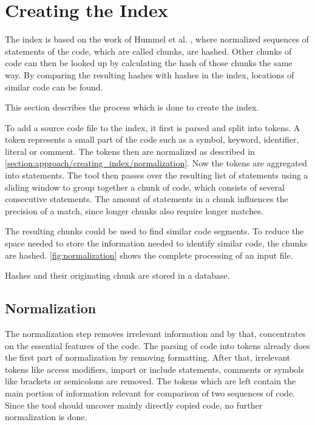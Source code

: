 \section{Creating the Index}\label{section:approach/creating_index}
The index is based on the work of Hummel et al. \cite{hummel2010index}, where normalized sequences of statements of the code, which are called chunks, are hashed.
Other chunks of code can then be looked up by calculating the hash of those chunks the same way.
By comparing the resulting hashes with hashes in the index, locations of similar code can be found.

This section describes the process which is done to create the index.

To add a source code file to the index, it first is parsed and split into tokens.
A token represents a small part of the code such as a symbol, keyword, identifier, literal or comment.
The tokens then are normalized as described in \autoref{section:approach/creating_index/normalization}.
Now the tokens are aggregated into statements.
The tool then passes over the resulting list of statements using a sliding window to group together a chunk of code, which consists of several consecutive statements.
The amount of statements in a chunk influences the precision of a match, since longer chunks also require longer matches.

The resulting chunks could be used to find similar code segments.
To reduce the space needed to store the information needed to identify similar code, the chunks are hashed.
\autoref{fig:normalization} shows the complete processing of an input file.

Hashes and their originating chunk are stored in a database.

\subsection{Normalization}\label{section:approach/creating_index/normalization}
The normalization step removes irrelevant information and by that, concentrates on the essential features of the code.
The parsing of code into tokens already does the first part of normalization by removing formatting.
After that, irrelevant tokens like access modifiers, import or include statements, comments or symbols like brackets or semicolons are removed.
The tokens which are left contain the main portion of information relevant for comparison of two sequences of code.
Since the tool should uncover mainly directly copied code, no further normalization is done.

